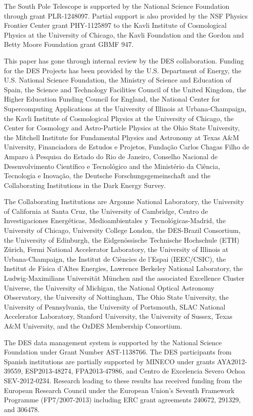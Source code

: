 \documentclass[useAMS,usenatbib,iop,numberedappendix]{mn2e}
\begin{document}
The South Pole Telescope is supported by the National Science Foundation through grant PLR-1248097. Partial support is also provided by the NSF Physics Frontier Center grant PHY-1125897 to the Kavli Institute of Cosmological Physics at the University of Chicago, the Kavli Foundation and the Gordon and Betty Moore Foundation grant GBMF 947.  

This paper has gone through internal review by the DES collaboration.  Funding for the DES Projects has been provided by the U.S. Department of Energy, the U.S. National Science Foundation, the Ministry of Science and Education of Spain, the Science and Technology Facilities Council of the United Kingdom, the Higher Education Funding Council for England, the National Center for Supercomputing  Applications at the University of Illinois at Urbana-Champaign, the Kavli Institute of Cosmological Physics at the University of Chicago, the Center for Cosmology and Astro-Particle Physics at the Ohio State University, the Mitchell Institute for Fundamental Physics and Astronomy at Texas A\&M University, Financiadora de Estudos e Projetos, Funda{\c c}{\~a}o Carlos Chagas Filho de Amparo {\`a} Pesquisa do Estado do Rio de Janeiro, Conselho Nacional de Desenvolvimento Cient{\'i}fico e Tecnol{\'o}gico and the Minist{\'e}rio da Ci{\^e}ncia, Tecnologia e Inova{\c c}{\~a}o, the Deutsche Forschungsgemeinschaft and the Collaborating Institutions in the Dark Energy Survey. 

The Collaborating Institutions are Argonne National Laboratory, the University of California at Santa Cruz, the University of Cambridge, Centro de Investigaciones Energ{\'e}ticas, Medioambientales y Tecnol{\'o}gicas-Madrid, the University of Chicago, University College London, the DES-Brazil Consortium, the University of Edinburgh, the Eidgen{\"o}ssische Technische Hochschule (ETH) Z{\"u}rich, Fermi National Accelerator Laboratory, the University of Illinois at Urbana-Champaign, the Institut de Ci{\`e}ncies de l'Espai (IEEC/CSIC), the Institut de F{\'i}sica d'Altes Energies, Lawrence Berkeley National Laboratory, the Ludwig-Maximilians Universit{\"a}t M{\"u}nchen and the associated Excellence Cluster Universe, the University of Michigan, the National Optical Astronomy Observatory, the University of Nottingham, The Ohio State University, the University of Pennsylvania, the University of Portsmouth, SLAC National Accelerator Laboratory, Stanford University, the University of Sussex, Texas A\&M University, and the OzDES Membership Consortium.

The DES data management system is supported by the National Science Foundation under Grant Number AST-1138766. The DES participants from Spanish institutions are partially supported by MINECO under grants AYA2012-39559, ESP2013-48274, FPA2013-47986, and Centro de Excelencia Severo Ochoa SEV-2012-0234.  Research leading to these results has received funding from the European Research Council under the European Union's Seventh Framework Programme (FP7/2007-2013) including ERC grant agreements  240672, 291329, and 306478.
\end{document}

